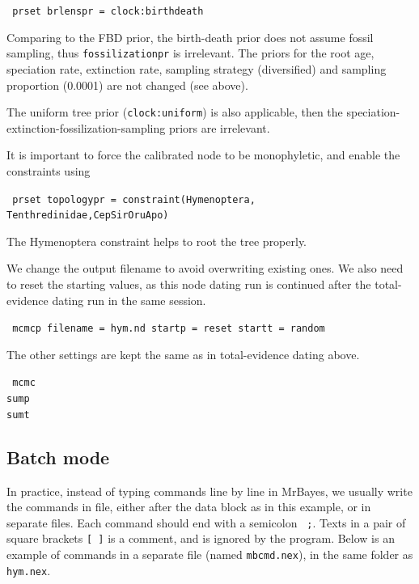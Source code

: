 \documentclass[12pt]{article}
\begin{document}
\medskip
{\tt \color{red} \noindent
prset brlenspr = clock:birthdeath
}
\medskip

\noindent Comparing to the FBD prior, the birth-death prior does not assume fossil sampling, thus {\tt fossilizationpr} is irrelevant. 
The priors for the root age, speciation rate, extinction rate, sampling strategy (diversified) and sampling proportion (0.0001) are not changed (see above).

The uniform tree prior ({\tt clock:uniform}) is also applicable, then the speciation-extinction-fossilization-sampling priors are irrelevant.

It is important to force the calibrated node to be monophyletic, and enable the constraints using

\medskip
{\tt \color{red} \noindent
prset topologypr = constraint(Hymenoptera,  \\
\hspace*{5cm} Tenthredinidae,CepSirOruApo)
}
\medskip

\noindent The Hymenoptera constraint helps to root the tree properly.

We change the output filename to avoid overwriting existing ones.
We also need to reset the starting values, as this node dating run is continued after the total-evidence dating run in the same session.

\medskip
{\tt \color{red} \noindent
mcmcp filename = hym.nd startp = reset startt = random
}
\medskip

\noindent The other settings are kept the same as in total-evidence dating above.

\medskip
{\tt \color{red} \noindent
mcmc  \\
sump  \\
sumt
}
\medskip

\subsection{Batch mode}

In practice, instead of typing commands line by line in MrBayes, we usually write the commands in file, either after the data block as in this example, or in separate files.
Each command should end with a semicolon {\tt \color{red} ;}.
Texts in a pair of square brackets {\tt [ ]} is a comment, and is ignored by the program.
Below is an example of commands in a separate file (named {\tt mbcmd.nex}), in the same folder as {\tt hym.nex}.
\end{document}
